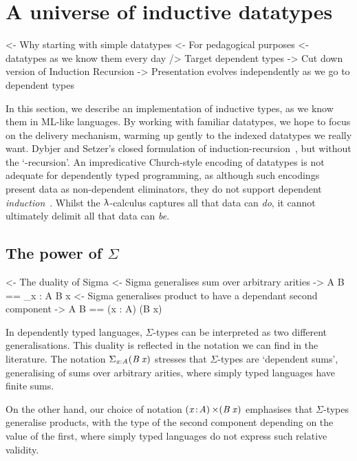 \section{A universe of inductive datatypes}
\label{sec:universe-desc}

\begin{wstructure}
<- Why starting with simple datatypes
    <- For pedagogical purposes
        <- datatypes as we know them every day
        /> Target dependent types
    -> Cut down version of Induction Recursion
        -> Presentation evolves independently as we go to dependent types
\end{wstructure}

In this section, we describe an implementation of inductive types, as
we know them in ML-like languages. By working with familiar datatypes,
we hope to focus on the delivery mechanism, warming up gently to the
indexed datatypes we really want.  %
Dybjer and Setzer's closed formulation of
induction-recursion~\cite{dybjer:axiom-ir}, but without the
`-recursion'.  An impredicative Church-style encoding of datatypes is
not adequate for dependently typed programming, as although such
encodings present data as non-dependent eliminators, they do not
support dependent \emph{induction}~\cite{geuvers:induction-not-derivable}.
Whilst the \(\LAMBINDER\)-calculus captures all that data can \emph{do},
it cannot ultimately delimit all that data can \emph{be}.

\subsection{The power of $\Sigma$}

\begin{wstructure}
<- The duality of Sigma
    <- Sigma generalises sum over arbitrary arities
        -> \Sigma A B == \Sigma_{x : A} B x
    <- Sigma generalises product to have a dependant second component
        -> \Sigma A B == (x : A) \times (B x)
\end{wstructure}

In dependently typed languages, $\Sigma$-types can be interpreted as
two different generalisations. This duality is reflected in the
notation we can find in the literature. The notation
$\blue{\Sigma}_{\x : \M{A}} (\M{B}\: \x)$ stresses that
$\Sigma$-types are `dependent sums', generalising of sums over
arbitrary arities, where simply typed languages have finite sums.

On the other hand, our choice of notation $\SIGMA{\x}{\M{A}}
(\M{B}\:\x)$ emphasises that $\Sigma$-types generalise products,
with the type of the second component depending on the value of the
first, where simply typed languages do not express such relative validity.

